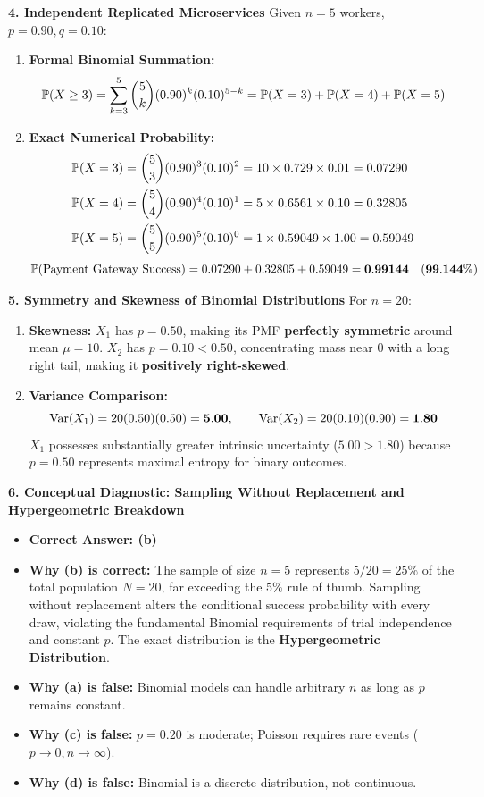\textbf{4. Independent Replicated Microservices}
Given $n = 5$ workers, $p = 0.90, q = 0.10$:
\begin{enumerate}
    \item \textbf{Formal Binomial Summation:}
    $$\P(X \ge 3) = \sum_{k=3}^5 \binom{5}{k} (0.90)^k (0.10)^{5-k} = \P(X = 3) + \P(X = 4) + \P(X = 5)$$
    \item \textbf{Exact Numerical Probability:}
    \begin{align*}
        \P(X = 3) &= \binom{5}{3} (0.90)^3 (0.10)^2 = 10 \times 0.729 \times 0.01 = 0.07290 \\
        \P(X = 4) &= \binom{5}{4} (0.90)^4 (0.10)^1 = 5 \times 0.6561 \times 0.10 = 0.32805 \\
        \P(X = 5) &= \binom{5}{5} (0.90)^5 (0.10)^0 = 1 \times 0.59049 \times 1.00 = 0.59049
    \end{align*}
    $$\P(\text{Payment Gateway Success}) = 0.07290 + 0.32805 + 0.59049 = \mathbf{0.99144 \quad (99.144\%)}$$
\end{enumerate}

\textbf{5. Symmetry and Skewness of Binomial Distributions}
For $n = 20$:
\begin{enumerate}
    \item \textbf{Skewness:} $X_1$ has $p = 0.50$, making its PMF \textbf{perfectly symmetric} around mean $\mu = 10$. $X_2$ has $p = 0.10 < 0.50$, concentrating mass near 0 with a long right tail, making it \textbf{positively right-skewed}.
    \item \textbf{Variance Comparison:}
    $$\Var(X_1) = 20(0.50)(0.50) = \mathbf{5.00}, \qquad \Var(X_2) = 20(0.10)(0.90) = \mathbf{1.80}$$
    $X_1$ possesses substantially greater intrinsic uncertainty ($5.00 > 1.80$) because $p = 0.50$ represents maximal entropy for binary outcomes.
\end{enumerate}

\textbf{6. Conceptual Diagnostic: Sampling Without Replacement and Hypergeometric Breakdown}
\begin{itemize}
    \item \textbf{Correct Answer: (b)}
    \item \textbf{Why (b) is correct:} The sample of size $n = 5$ represents $5/20 = 25\%$ of the total population $N = 20$, far exceeding the $5\%$ rule of thumb. Sampling without replacement alters the conditional success probability with every draw, violating the fundamental Binomial requirements of trial independence and constant $p$. The exact distribution is the \textbf{Hypergeometric Distribution}.
    \item \textbf{Why (a) is false:} Binomial models can handle arbitrary $n$ as long as $p$ remains constant.
    \item \textbf{Why (c) is false:} $p = 0.20$ is moderate; Poisson requires rare events ($p \to 0, n \to \infty$).
    \item \textbf{Why (d) is false:} Binomial is a discrete distribution, not continuous.
\end{itemize}

